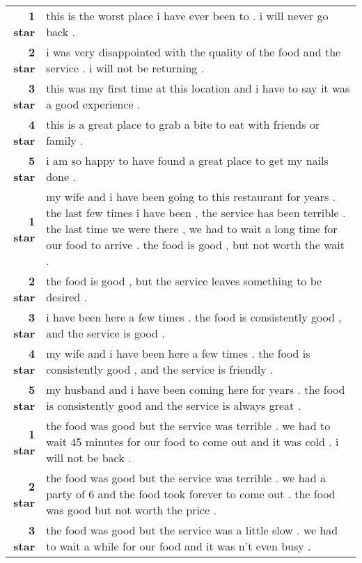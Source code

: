\documentclass{article}
\begin{document}
\begin{table*}[!thbp]
\begin{tabular}{r  p{12cm}}
    {\bf 1 star} & this is the worst place i have ever been to . i will never go
                   back . \\
    {\bf 2 star} & i was very disappointed with the quality of the food and the
                   service . i will not be returning . \\
    {\bf 3 star} & this was my first time at this location and i have to say it
                   was a good experience . \\
    {\bf 4 star} & this is a great place to grab a bite to eat with friends or
                   family . \\
    {\bf 5 star} & i am so happy to have found a great place to get my nails done
                   . \\
    \midrule
    {\bf 1 star} & my wife and i have been going to this restaurant for years
                   . the last few times i have been , the service has been
                   terrible . the last time we were there , we had to wait a
                   long time for our food to arrive . the food is good , but
                   not worth the wait . \\
    {\bf 2 star} & the food is good , but the service leaves something to be
                   desired . \\
    {\bf 3 star} & i have been here a few times . the food is consistently
                   good , and the service is good . \\
    {\bf 4 star} & my wife and i have been here a few times . the food is
                   consistently good , and the service is friendly . \\
    {\bf 5 star} & my husband and i have been coming here for years . the food
                   is consistently good and the service is always great . \\
    \midrule
    {\bf 1 star} & the food was good but the service was terrible . we had to
                   wait 45 minutes for our food to come out and it was cold . i
                   will not be back .\\
    {\bf 2 star} & the food was good but the service was
                   terrible . we had a party of 6 and the food
                   took forever to come out . the food was good
                   but not worth the price . \\
    {\bf 3 star} & the food was good but the service was a little slow . we
                   had to wait a while for our food and it was n't even busy
                   . \\

\end{tabular}
\end{table*}
\end{document}
